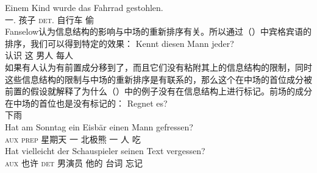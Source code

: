\ex
\gll Einem Kind wurde das Fahrrad gestohlen.\\
     一.\dat{} 孩子 \passivepst{} \textsc{det}.\nom{} 自行车 偷\\
\zl
Fanselow认为信息结构的影响与中场的重新排序有关。所以通过（）中宾格宾语的排序，我们可以得到特定的效果：
\ea
\gll Kennt diesen Mann jeder?\\
     认识 这 男人 每人\\
\z
如果有人认为有前置成分移到了\vfc，而且它们没有粘附其上的信息结构的限制，同时这些信息结构的限制与中场的重新排序是有联系的，那么这个在中场的首位成分被前置的假设就解释了为什么（）中的例子没有在信息结构上进行标记。前场的成分在中场的首位也是没有标记的：
\eal
\ex
\gll Regnet es?\\
     下雨 \expl\\
\ex 
\gll Hat am Sonntag ein Eisbär einen Mann gefressen?\\
     \textsc{aux} \textsc{prep} 星期天  一   北极熊 一 人 吃\\
\ex 
\gll Hat vielleicht der Schauspieler seinen Text vergessen?\\
     \textsc{aux} 也许    \textsc{det} 男演员 他的 台词 忘记\\
